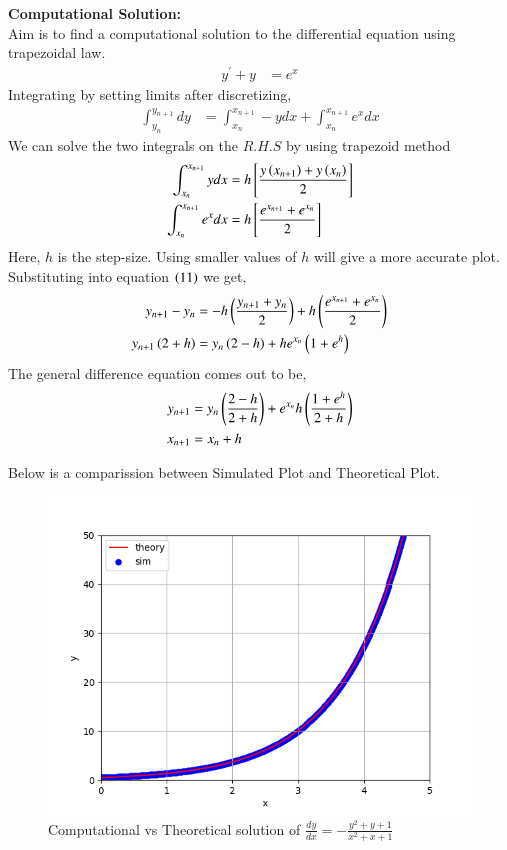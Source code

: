 \documentclass[journal]{IEEEtran}
\begin{document}
\textbf{Computational Solution:}\\
Aim is to find a computational solution to the differential equation using trapezoidal law.
\begin{align}
  y^{\prime}+y&=e^x
\end{align}
Integrating by setting limits after discretizing,
\begin{align}
  \int_{y_n}^{y_{n+1}}dy&=\int_{x_n}^{x_{n+1}}-y dx +\int_{x_n}^{x_{n+1}} e^x dx
\end{align}
We can solve the two integrals on the $R.H.S$ by using trapezoid method
\begin{align}
  \int_{x_n}^{x_{n+1}}ydx&= h{}\left[\frac{y\left(x_{n+1}\right)+y\left(x_n\right)}{2}\right]\\
  \int_{x_n}^{x_{n+1}}e^xdx&= h{}\left[\frac{e^{x_{n+1}}+e^{x_n} }{2}\right]
\end{align}
Here, $h$ is the step-size. Using smaller values of $h$ will give a more accurate plot. Substituting into equation $\left(11\right)$ we get,
\begin{align}
  y_{n+1}-y_{n}&=-h\left(\frac{y_{n+1}+y_{n}}{2}\right)+h\left(\frac{e^{x_{n+1}}+e^{x_n}}{2}\right)\\
  y_{n+1}\left(2+h\right)&=y_n\left(2-h\right)+he^{x_n}\left(1+e^h\right)
\end{align}
The general difference equation comes out to be,
\begin{align}
  y_{n+1}&=y_n\left(\frac{2-h}{2+h}\right)+e^{x_n}h\left(\frac{1+e^h}{2+h}\right)\\
  x_{n+1}&=x_n+h
\end{align}

Below is a comparission between Simulated Plot and Theoretical Plot.
\begin{figure}[h!]
   \centering
   \includegraphics[width=1\columnwidth]{figs/fig.png}
   \caption{Computational vs Theoretical solution of $ \frac{dy}{dx}=-\frac{y^2+y+1}{x^2+x+1}$}
   \label{stemplot}
\end{figure}
\end{document}

